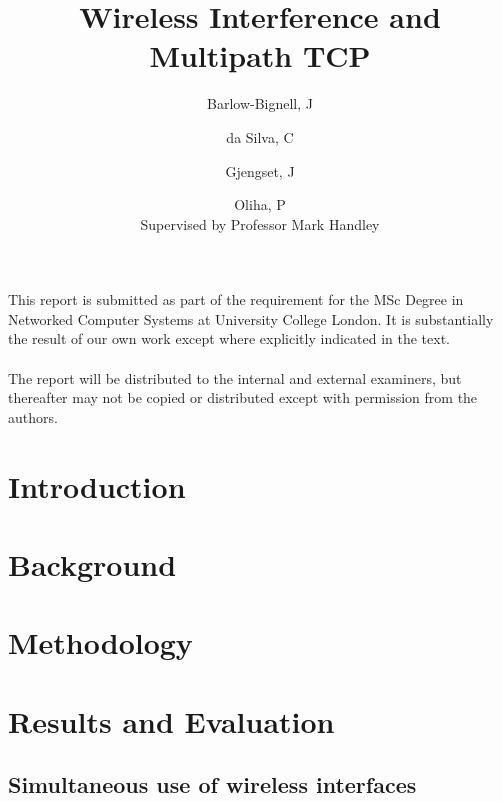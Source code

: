 \documentclass[12pt,a4paper]{article}
\title{Wireless Interference and Multipath TCP}
\author{Barlow-Bignell, J}
\author{da Silva, C}
\author{Gjengset, J}
\author{Oliha, P\\{\small Supervised by Professor Mark Handley}}
\affil{MSc in Networked Computer Systems\\University College London}
\date{}
\begin{document}
\maketitle
\thispagestyle{empty}

\begin{abstract}

\end{abstract}

\vfill
\tiny
\noindent
This report is submitted as part of the requirement for the MSc Degree in
Networked Computer Systems at University College London. It is substantially the
result of our own work except where explicitly indicated in the text.
\\
\\
\noindent
The report will be distributed to the internal and external examiners, but
thereafter may not be copied or distributed except with permission from the
authors.

\normalsize
\clearpage

\tableofcontents
\thispagestyle{empty}

\clearpage
\setcounter{page}{1}
\onehalfspacing

\section{Introduction}

\FloatBarrier

\clearpage
\section{Background}
\label{sec:bg}

\FloatBarrier

\clearpage
\section{Methodology}
\label{sec:met}

\FloatBarrier

\clearpage
\section{Results and Evaluation}
\label{sec:results}

\subsection{Simultaneous use of wireless interfaces}
\label{sec:results-interference}

\FloatBarrier
\clearpage
\end{document}
